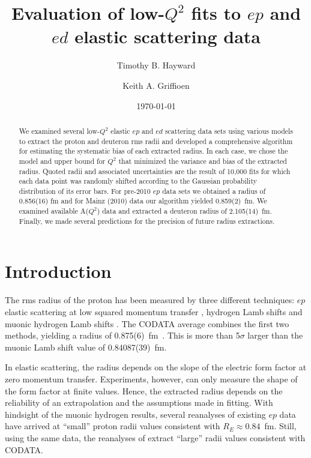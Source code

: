 \documentclass[aps,prd,twocolumn,groupedaddress,10pt]{revtex4-1}
\begin{document}
\title{Evaluation of low-$Q^2$ fits to $ep$ and $ed$ elastic scattering data}

\author{Timothy B. Hayward}
\author{Keith A. Griffioen}

\date{\today}

\begin{abstract}
We examined several low-$Q^2$ elastic $ep$ and $ed$ scattering data sets using various models to extract the proton and deuteron rms radii and developed a comprehensive algorithm for estimating the systematic bias of each extracted radius. In each case, we chose the model and upper bound for $Q^2$ that minimized the variance and bias of the extracted radius. Quoted radii and associated uncertainties are the result of 10,000 fits for which each data point was randomly shifted according to the Gaussian probability distribution of its error bars. For pre-2010 $ep$ data sets we obtained a radius of 0.856(16) fm and for Mainz (2010) data our algorithm yielded 0.859(2)~fm. We examined available A($Q^2$) data and extracted a deuteron radius of 2.105(14)~fm. Finally, we made several predictions for the precision of future radius extractions.
\end{abstract}

\pacs{}


\maketitle

\section{Introduction}
The rms radius of the proton has been measured by three different techniques: $ep$ elastic scattering at low squared momentum transfer \cite{Hand1963, Yerevan1972, Saskatoon1974, Mainz1974, Mainz1975,Mainz1980, Mainz2010},  hydrogen Lamb shifts \cite{hyd_lamb1, hyd_lamb2, hyd_lamb3, hyd_lamb4, hyd_lamb5} and muonic hydrogen Lamb shifts \cite{Pohl2010,Antognini2013}. The CODATA average combines the first two methods, yielding a radius of 0.875(6)~fm~\cite{CODATA}. This is more than 5$\sigma$ larger than the muonic Lamb shift value of 0.84087(39)~fm.

In elastic scattering, the radius depends on the slope of the electric form factor at zero momentum transfer. Experiments, however, can only measure the shape of the form factor at finite values. Hence, the extracted radius depends on the reliability of an extrapolation and the assumptions made in fitting. With hindsight of the muonic hydrogen results, several reanalyses of existing $ep$ data~\cite{smallRadii1,smallRadii2,smallRadii3,smallRadii4,smallRadii5} have arrived at ``small'' proton radii values consistent with $R_E \approx 0.84$~fm. Still, using the same data, the reanalyses of \cite{largeRadii1,largeRadii2,largeRadii3,largeRadii4,largeRadii5} extract ``large'' radii values consistent with CODATA.
\end{document}
